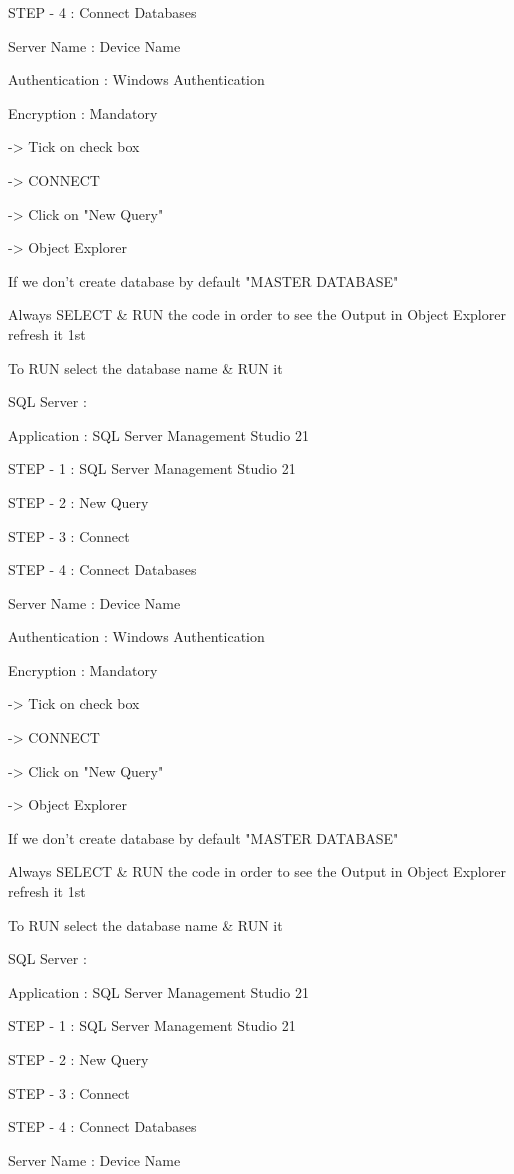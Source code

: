 STEP - 4 : Connect Databases


Server Name : Device Name

Authentication : Windows Authentication

Encryption : Mandatory

-> Tick on check box

-> CONNECT

-> Click on "New Query"

-> Object Explorer


If we don't create database by default "MASTER DATABASE"


Always SELECT & RUN the code in order to see the Output in Object Explorer refresh it 1st


To RUN select the database name & RUN it

SQL Server :

Application : SQL Server Management Studio 21

STEP - 1 : SQL Server Management Studio 21

STEP - 2 : New Query

STEP - 3 : Connect

STEP - 4 : Connect Databases


Server Name : Device Name

Authentication : Windows Authentication

Encryption : Mandatory

-> Tick on check box

-> CONNECT

-> Click on "New Query"

-> Object Explorer


If we don't create database by default "MASTER DATABASE"


Always SELECT & RUN the code in order to see the Output in Object Explorer refresh it 1st


To RUN select the database name & RUN it

SQL Server :

Application : SQL Server Management Studio 21

STEP - 1 : SQL Server Management Studio 21

STEP - 2 : New Query

STEP - 3 : Connect

STEP - 4 : Connect Databases


Server Name : Device Name

